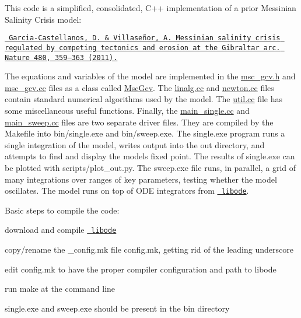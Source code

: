 This code is a simplified, consolidated, C++ implementation of a prior Messinian Salinity Crisis model\+:
\begin{DoxyItemize}
\item \href{http://www.nature.com/articles/nature10651}{\texttt{ Garcia-\/\+Castellanos, D. \& Villaseñor, A. Messinian salinity crisis regulated by competing tectonics and erosion at the Gibraltar arc. Nature 480, 359–363 (2011).}}
\end{DoxyItemize}

The equations and variables of the model are implemented in the {\ttfamily \mbox{\hyperlink{msc__gcv_8h}{msc\+\_\+gcv.\+h}}} and {\ttfamily \mbox{\hyperlink{msc__gcv_8cc}{msc\+\_\+gcv.\+cc}}} files as a class called \mbox{\hyperlink{class_msc_gcv}{Msc\+Gcv}}. The {\ttfamily \mbox{\hyperlink{linalg_8cc}{linalg.\+cc}}} and {\ttfamily \mbox{\hyperlink{newton_8cc}{newton.\+cc}}} files contain standard numerical algorithms used by the model. The {\ttfamily \mbox{\hyperlink{util_8cc}{util.\+cc}}} file has some miscellaneous useful functions. Finally, the {\ttfamily \mbox{\hyperlink{main__single_8cc}{main\+\_\+single.\+cc}}} and {\ttfamily \mbox{\hyperlink{main__sweep_8cc}{main\+\_\+sweep.\+cc}}} files are two separate driver files. They are compiled by the Makefile into {\ttfamily bin/single.\+exe} and {\ttfamily bin/sweep.\+exe}. The {\ttfamily single.\+exe} program runs a single integration of the model, writes output into the {\ttfamily out} directory, and attempts to find and display the model\textquotesingle{}s fixed point. The results of {\ttfamily single.\+exe} can be plotted with {\ttfamily scripts/plot\+\_\+out.\+py}. The {\ttfamily sweep.\+exe} file runs, in parallel, a grid of many integrations over ranges of key parameters, testing whether the model oscillates. The model runs on top of O\+DE integrators from \href{https://github.com/wordsworthgroup/libode}{\texttt{ libode}}.

Basic steps to compile the code\+:
\begin{DoxyEnumerate}
\item download and compile \href{https://github.com/wordsworthgroup/libode}{\texttt{ libode}}
\item copy/rename the {\ttfamily \+\_\+config.\+mk} file {\ttfamily config.\+mk}, getting rid of the leading underscore
\item edit {\ttfamily config.\+mk} to have the proper compiler configuration and path to {\ttfamily libode}
\item run {\ttfamily make} at the command line
\item {\ttfamily single.\+exe} and {\ttfamily sweep.\+exe} should be present in the {\ttfamily bin} directory
\end{DoxyEnumerate}

